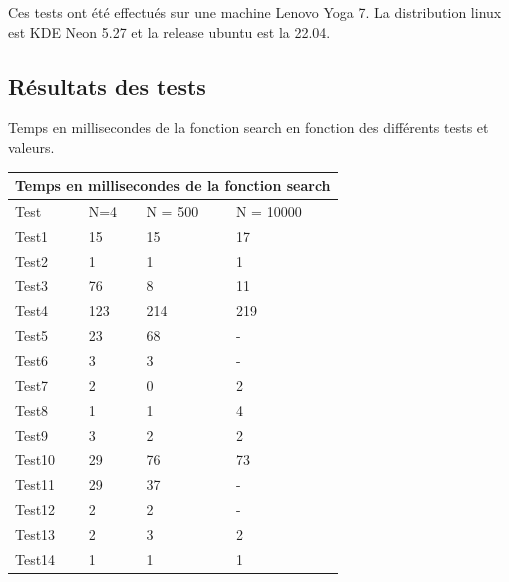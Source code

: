 \documentclass[utf8]{article}
\begin{document}
\begin{large}
    \indent
    \par
    Ces tests ont été effectués sur une machine Lenovo Yoga 7. La distribution
    linux est KDE Neon 5.27 et la release ubuntu est la 22.04.
    \indent
    \newpage
    \subsection{Résultats des tests}
    \indent
    \par
    Temps en millisecondes de la fonction search en fonction des différents tests et valeurs.

    \begin{tabular}{ |p{3cm}||p{3cm}|p{3cm}|p{3cm}|  }
        \hline
        \multicolumn{4}{|c|}{Temps en millisecondes de la fonction search} \\
        \hline
        Test   & N=4 & N = 500 & N = 10000                                 \\
        \hline
        Test1  & 15  & 15      & 17                                        \\
        Test2  & 1   & 1       & 1                                         \\
        Test3  & 76  & 8       & 11                                        \\
        Test4  & 123 & 214     & 219                                       \\
        Test5  & 23  & 68      & -                                         \\
        Test6  & 3   & 3       & -                                         \\
        Test7  & 2   & 0       & 2                                         \\
        Test8  & 1   & 1       & 4                                         \\
        Test9  & 3   & 2       & 2                                         \\
        Test10 & 29  & 76      & 73                                        \\
        Test11 & 29  & 37      & -                                         \\
        Test12 & 2   & 2       & -                                         \\
        Test13 & 2   & 3       & 2                                         \\
        Test14 & 1   & 1       & 1                                         \\


\end{tabular}
\end{large}
\end{document}
